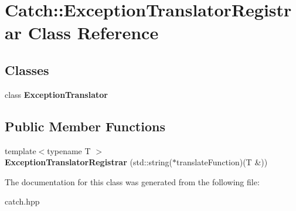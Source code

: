 \hypertarget{classCatch_1_1ExceptionTranslatorRegistrar}{
\section{Catch::ExceptionTranslatorRegistrar Class Reference}
\label{classCatch_1_1ExceptionTranslatorRegistrar}
}
\subsection*{Classes}
\begin{DoxyCompactItemize}
\item 
class {\bfseries ExceptionTranslator}
\end{DoxyCompactItemize}
\subsection*{Public Member Functions}
\begin{DoxyCompactItemize}
\item 
\hypertarget{classCatch_1_1ExceptionTranslatorRegistrar_a5452c3c30eabcf90901a9e110e0d8f32}{
{\footnotesize template$<$typename T $>$ }\\{\bfseries ExceptionTranslatorRegistrar} (std::string($\ast$translateFunction)(T \&))}
\label{classCatch_1_1ExceptionTranslatorRegistrar_a5452c3c30eabcf90901a9e110e0d8f32}

\end{DoxyCompactItemize}


The documentation for this class was generated from the following file:\begin{DoxyCompactItemize}
\item 
catch.hpp\end{DoxyCompactItemize}
